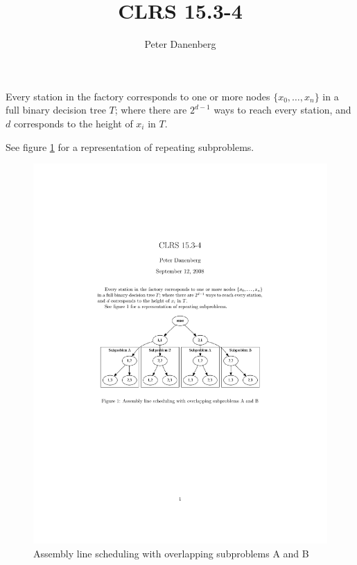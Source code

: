\documentclass{article}
\title{CLRS 15.3-4}
\author{Peter Danenberg}
\begin{document}
\maketitle

Every station in the factory corresponds to one or more nodes $\{x_0,
  \dots, x_n\}$ in a full binary decision tree $T$; where there are
  $2^{d-1}$ ways to reach every station, and $d$ corresponds to the
  height of $x_i$ in $T$.

See figure \ref{fig:assembly} for a representation of repeating
subproblems.

\begin{figure}[ht]
  \includegraphics[width=\linewidth]{15.3-4}
  \caption{Assembly line scheduling with overlapping subproblems A and B}
  \label{fig:assembly}
\end{figure}
\end{document}
